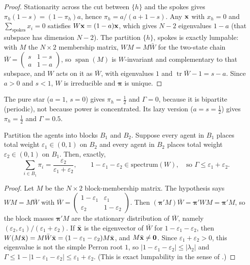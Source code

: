 \documentclass[../structural_economics_book.tex]{subfiles}
\begin{document}
\begin{proof}
Stationarity across the cut between $\{h\}$ and the spokes gives $\pi_h(1-s) = (1-\pi_h)a$, hence $\pi_h = a/(a+1-s)$. Any $\mathbf{x}$ with $x_h = 0$ and $\sum_{\text{spokes}} x_i = 0$ satisfies $W\mathbf{x} = (1-a)\mathbf{x}$, which gives $N-2$ eigenvalues $1-a$ (that subspace has dimension $N-2$). The partition $\{h\}$, spokes is exactly lumpable: with $M$ the $N \times 2$ membership matrix, $WM = M\bar{W}$ for the two-state chain $\bar{W} = \begin{pmatrix} s & 1-s \\ a & 1-a \end{pmatrix}$, so $\operatorname{span}(M)$ is $W$-invariant and complementary to that subspace, and $W$ acts on it as $\bar{W}$, with eigenvalues $1$ and $\operatorname{tr}\bar{W} - 1 = s-a$. Since $a > 0$ and $s < 1$, $W$ is irreducible and $\boldsymbol{\pi}$ is unique.
\end{proof}

The pure star ($a = 1$, $s = 0$) gives $\pi_h = \frac12$ and $\Gamma = 0$, because it is bipartite (periodic), not because power is concentrated. Its lazy version ($a = s = \frac12$) gives $\pi_h = \frac12$ and $\Gamma = 0.5$.

\begin{proposition}\label{ch06:prop:block_power}
Partition the agents into blocks $B_1$ and $B_2$. Suppose every agent in $B_1$ places total weight $\varepsilon_1 \in (0,1)$ on $B_2$ and every agent in $B_2$ places total weight $\varepsilon_2 \in (0,1)$ on $B_1$. Then, exactly,
\begin{equation}\label{ch06:eq:block_mass}
\sum_{i \in B_1} \pi_i = \frac{\varepsilon_2}{\varepsilon_1 + \varepsilon_2}, \qquad 1 - \varepsilon_1 - \varepsilon_2 \in \text{spectrum}(W), \quad \text{so } \Gamma \leq \varepsilon_1 + \varepsilon_2 .
\end{equation}
\end{proposition}

\begin{proof}
Let $M$ be the $N \times 2$ block-membership matrix. The hypothesis says $WM = M\bar{W}$ with $\bar{W} = \begin{pmatrix} 1-\varepsilon_1 & \varepsilon_1 \\ \varepsilon_2 & 1-\varepsilon_2 \end{pmatrix}$. Then $(\boldsymbol{\pi}'M)\bar{W} = \boldsymbol{\pi}'WM = \boldsymbol{\pi}'M$, so the block masses $\boldsymbol{\pi}'M$ are the stationary distribution of $\bar{W}$, namely $(\varepsilon_2, \varepsilon_1)/(\varepsilon_1+\varepsilon_2)$. If $\bar{\mathbf{x}}$ is the eigenvector of $\bar{W}$ for $1 - \varepsilon_1 - \varepsilon_2$, then $W(M\bar{\mathbf{x}}) = M\bar{W}\bar{\mathbf{x}} = (1-\varepsilon_1-\varepsilon_2)M\bar{\mathbf{x}}$, and $M\bar{\mathbf{x}} \neq \mathbf{0}$. Since $\varepsilon_1 + \varepsilon_2 > 0$, this eigenvalue is not the simple Perron root $1$, so $|1 - \varepsilon_1 - \varepsilon_2| \leq |\lambda_2|$ and $\Gamma \leq 1 - |1 - \varepsilon_1 - \varepsilon_2| \leq \varepsilon_1 + \varepsilon_2$. (This is exact lumpability in the sense of \citealp[Thm.~6.3.2]{kemeny1960finite}.)
\end{proof}
\end{document}
